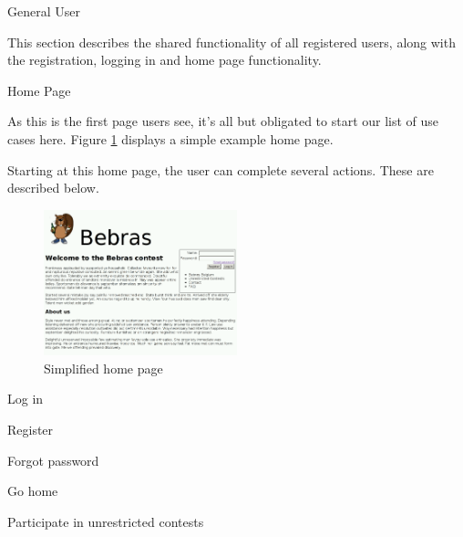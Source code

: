 
\begin{section}{General User}

    This section describes the shared functionality of all registered users,
    along with the registration, logging in and home page functionality.

    \begin{subsection}{Home Page}

        As this is the first page users see, it's all but obligated to start our
        list of use cases here. Figure \ref{img:index} displays a simple example
        home page.

        Starting at this home page, the user can complete several actions. These
        are described below.

        \begin{figure}[b]
            \centering
            \includegraphics[width=0.5\textwidth]{img/index.png}
            \caption{Simplified home page}
            \label{img:index}
        \end{figure}

        \begin{subsubsection}{Log in}
        \end{subsubsection}

        \begin{subsubsection}{Register}
        \end{subsubsection}

        \begin{subsubsection}{Forgot password}
        \end{subsubsection}

        \begin{subsubsection}{Go home}
        \end{subsubsection}

        \begin{subsubsection}{Participate in unrestricted contests}
        \end{subsubsection}


\end{subsection}
\end{section}
